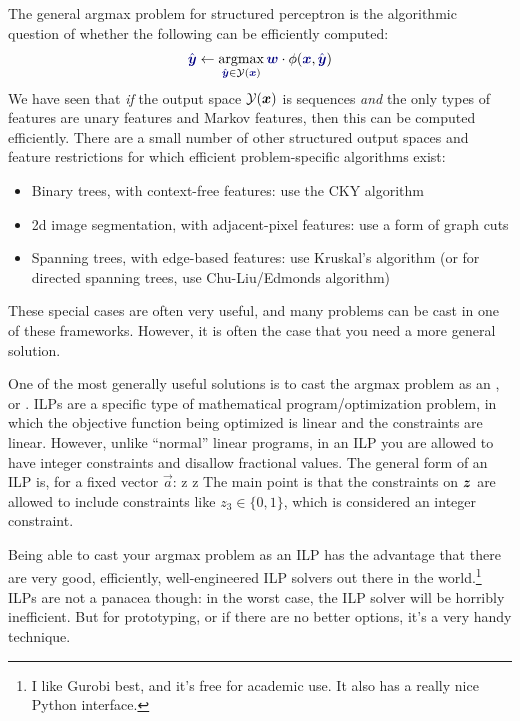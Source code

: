 The general argmax problem for structured perceptron is the algorithmic question of whether the following can be efficiently computed:
\begin{align}
\VARm{\hat \vy} \leftarrow \argmax_{\VARm{\hat\vy} \in \cY(\VARm{\vx})} \dotp{\VARm{\vw}}{\phi(\VARm{\vx},\VARm{\hat\vy})} \label{eq:srl:argmax2}
\end{align}
We have seen that \emph{if} the output space $\mathcal{Y}({\boldsymbol{x}})$ is sequences \emph{and} the only types of features are unary features and Markov features, then this can be computed efficiently.
There are a small number of other structured output spaces and feature restrictions for which efficient problem-specific algorithms exist:
\begin{itemize}
\item Binary trees, with context-free features: use the CKY algorithm
\item 2d image segmentation, with adjacent-pixel features: use a form of graph cuts
\item Spanning trees, with edge-based features: use Kruskal's algorithm (or for directed spanning trees, use Chu-Liu/Edmonds algorithm)
\end{itemize}
These special cases are often very useful, and many problems can be cast in one of these frameworks.
However, it is often the case that you need a more general solution.

One of the most generally useful solutions is to cast the argmax problem as an , or .
ILPs are a specific type of mathematical program/optimization problem, in which the objective function being optimized is linear and the constraints are linear.
However, unlike ``normal'' linear programs, in an ILP you are allowed to have integer constraints and disallow fractional values.
The general form of an ILP is, for a fixed vector $\vec a$:
  {\vec z}
  {}
  { \vec z}
The main point is that the constraints on ${\boldsymbol{z}}$ are allowed to include constraints like $z_{3} \in \{ 0, 1 \}$, which is considered an integer constraint.

Being able to cast your argmax problem as an ILP has the advantage that there are very good, efficiently, well-engineered ILP solvers out there in the world.\footnote{I like Gurobi best, and it's free for academic use. It also has a really nice Python interface.}
ILPs are not a panacea though: in the worst case, the ILP solver will be horribly inefficient. But for prototyping, or if there are no better options, it's a very handy technique.


